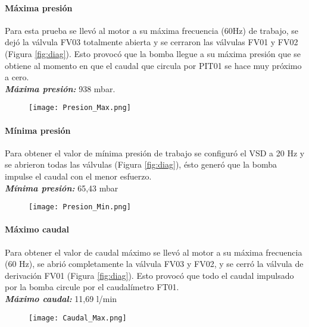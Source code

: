 {\paragraph{Máxima presión}

Para esta prueba se llevó al motor a su máxima frecuencia (60Hz) de trabajo, se dejó la válvula FV03 totalmente abierta y se cerraron las válvulas FV01 y FV02 (Figura  \ref{fig:diag}). Esto provocó que la bomba llegue a su máxima presión que se obtiene al momento en que el caudal que circula por PIT01 se hace muy próximo a cero.\\
\textbf{\textit{Máxima presión:}} 938 mbar.
\begin{figure}[h!]
	\centering
	\texttt{[image: Presion\_Max.png]}
	\label{fig:PMAX}
\end{figure}
\clearpage
\paragraph{Mínima presión}
Para obtener el valor de mínima presión de trabajo se configuró el VSD a 20 Hz y se abrieron todas las válvulas (Figura  \ref{fig:diag}), ésto generó que la bomba impulse el caudal con el menor esfuerzo. \\
\textbf{\textit{Mínima presión:}} 65,43 mbar
\begin{figure}[h!]
	\centering
	\texttt{[image: Presion\_Min.png]}
	\label{fig:Pmin}
\end{figure}
\clearpage
\paragraph{Máximo caudal}
Para obtener el valor de caudal máximo se llevó al motor a su máxima frecuencia (60 Hz), se abrió completamente la válvula FV03 y FV02, y se cerró la válvula de derivación FV01 (Figura  \ref{fig:diag}).
Esto provocó que todo el caudal impulsado por la bomba circule por el caudalímetro FT01.\\
\textbf{\textit{Máximo caudal: }}11,69 l/min
\begin{figure}[h!]
	\centering
	\texttt{[image: Caudal\_Max.png]}
	\label{fig:CM}
\end{figure}


\clearpage

}
